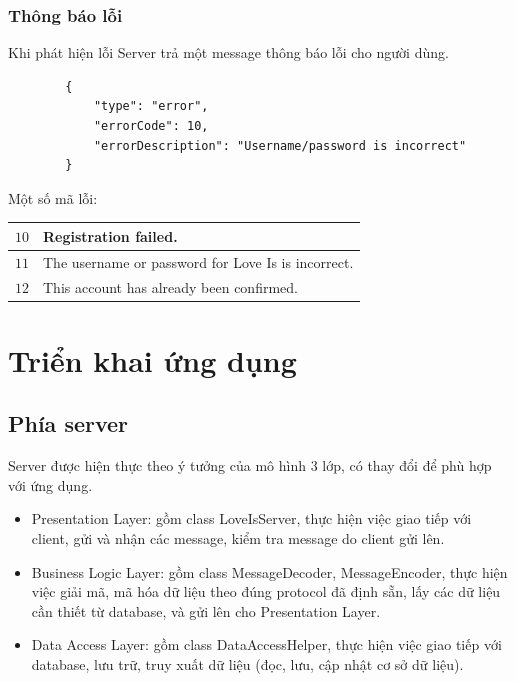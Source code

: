 \documentclass[10pt]{article}
\begin{document}
			\subsubsection{Thông báo lỗi}
				Khi phát hiện lỗi Server trả một message thông báo lỗi cho người dùng.
				\begin{lstlisting}
	    {
		    "type": "error",
		    "errorCode": 10,
		    "errorDescription": "Username/password is incorrect"
	    }
            		\end{lstlisting}
            		Một số mã lỗi:
            		\begin{center}
            		\begin{tabular}{l|l}
			\hline 
			$10$ & Registration failed. \\ 
			\hline 
			$11$ & The username or password for Love Is is incorrect. \\ 
			\hline 
			$12$ & This account has already been confirmed.\\
			\hline 
				\end{tabular}
            		\end{center}
	\section{Triển khai ứng dụng}
		\subsection{Phía server}
		Server được hiện thực theo ý tưởng của mô hình 3 lớp, có thay đổi để phù hợp với ứng dụng.
			\begin{itemize}
				\item Presentation Layer: gồm class LoveIsServer, thực hiện việc giao tiếp với client, gửi và nhận các message, kiểm tra message do client gửi lên.
				\item Business Logic Layer: gồm class MessageDecoder, MessageEncoder, thực hiện việc giải mã, mã hóa dữ liệu theo đúng protocol đã định sẵn, lấy các dữ liệu cần thiết từ database, và gửi lên cho Presentation Layer.
				\item Data Access Layer: gồm class DataAccessHelper, thực hiện việc giao tiếp với database, lưu trữ, truy xuất dữ liệu (đọc, lưu, cập nhật cơ sở dữ liệu).
			\end{itemize}
\end{document}
